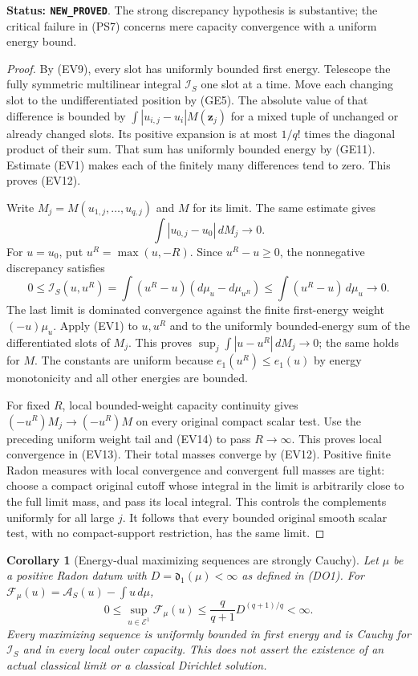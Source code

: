 \documentclass[11pt,a4paper]{article}
\numberwithin{equation}{section}
\newtheorem{corollary}[theorem]{Corollary}
\theoremstyle{definition}
\theoremstyle{remark}
\begin{document}
\noindent\textbf{Status: \texttt{NEW\_PROVED}}. The
strong discrepancy hypothesis is substantive; the critical
failure in (PS7) concerns mere capacity convergence with
a uniform energy bound.

\begin{proof}
By (EV9), every slot has uniformly bounded first energy.
Telescope the fully symmetric multilinear integral
$\mathcal I_S$ one slot at a time. Move each changing
slot to the undifferentiated position by (GE5).
The absolute value of that difference is bounded by
$\int|u_{i,j}-u_i|M(\mathbf z_j)$ for a mixed tuple
of unchanged or already changed slots. Its positive
expansion is at most $1/q!$ times the diagonal product
of their sum. That sum has uniformly bounded energy by
(GE11). Estimate (EV1) makes each of the finitely many
differences tend to zero. This proves (EV12).

Write $M_j=M(u_{1,j},\ldots,u_{q,j})$ and $M$ for its
limit. The same estimate gives
\[
                  \int|u_{0,j}-u_0|\,dM_j\longrightarrow0.
 \tag{EV14}
\]
For $u=u_0$, put $u^R=\max(u,-R)$. Since $u^R-u\geq0$,
the nonnegative discrepancy satisfies
\[
 0\leq\mathscr I_S(u,u^R)
       =\int(u^R-u)(d\mu_u-d\mu_{u^R})
       \leq\int(u^R-u)\,d\mu_u\longrightarrow0.
 \tag{EV15}
\]
The last limit is dominated convergence against the finite
first-energy weight $(-u)\mu_u$.
Apply (EV1) to $u,u^R$ and to the uniformly bounded-energy
sum of the differentiated slots of $M_j$. This proves
$\sup_j\int|u-u^R|\,dM_j\to0$; the same holds for $M$.
The constants are uniform because $e_1(u^R)\leq e_1(u)$
by energy monotonicity and all other energies are bounded.

For fixed $R$, local bounded-weight capacity continuity
gives $(-u^R)M_j\to(-u^R)M$ on every original compact
scalar test. Use the preceding uniform weight tail and
(EV14) to pass $R\to\infty$. This proves local convergence
in (EV13). Their total masses converge by (EV12).
Positive finite Radon measures with local convergence
and convergent full masses are tight: choose a compact
original cutoff whose integral in the limit is arbitrarily
close to the full limit mass, and pass its local integral.
This controls the complements uniformly for all large $j$.
It follows that every bounded original smooth scalar test,
with no compact-support restriction, has the same limit.
\end{proof}

\begin{corollary}[Energy-dual maximizing sequences are strongly Cauchy]
\label{cor:r11-dual-maximizing-Cauchy}
Let $\mu$ be a positive Radon datum with
$D=\mathfrak d_1(\mu)<\infty$ as defined in (DO1).
For $\mathcal F_\mu(u)=\mathscr A_S(u)-\int u\,d\mu$,
\[
 0\leq\sup_{u\in\mathcal E^1}\mathcal F_\mu(u)
               \leq\frac q{q+1}D^{(q+1)/q}<\infty.
 \tag{EV16}
\]
Every maximizing sequence is uniformly bounded in first
energy and is Cauchy for $\mathscr I_S$ and in every local
outer capacity. This does not assert the existence of an
actual classical limit or a classical Dirichlet solution.
\end{corollary}
\end{document}
